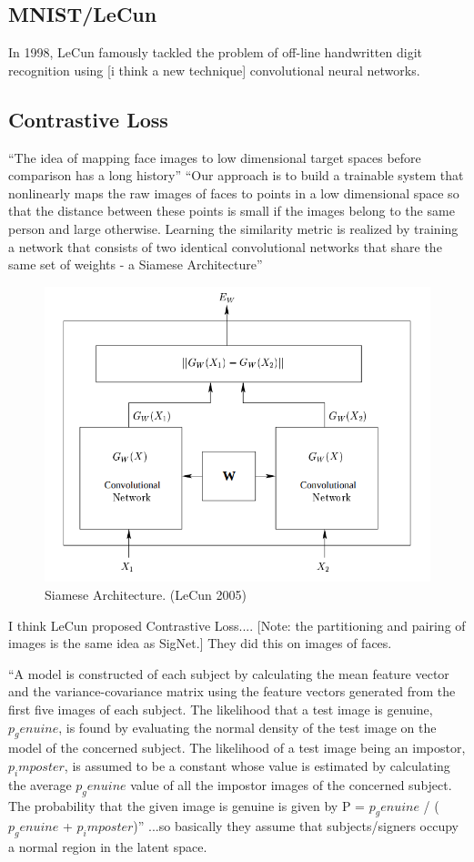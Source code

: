\subsection{MNIST/LeCun}
In 1998, LeCun famously tackled the problem of off-line handwritten digit recognition using [i think a new technique] convolutional neural networks\cite{mnist}.


\subsection{Contrastive Loss}
``The idea of mapping face images to low dimensional target spaces before comparison has a long history''
``Our approach is to build a trainable system that nonlinearly maps the raw images of faces to points in a low dimensional space so that the distance between these points is
small if the images belong to the same person and large otherwise. Learning the similarity metric is realized by training a network that consists of two identical convolutional
networks that share the same set of weights - a Siamese Architecture''
\begin{figure}[h]
    \begin{center}
        \includegraphics[width=0.8\linewidth]{siamese_architecture.png}
    \end{center}
    \caption{Siamese Architecture. (LeCun 2005)}
    \label{fig:siamese}
\end{figure}
I think LeCun proposed Contrastive Loss...\cite{LeCun}.
[Note: the partitioning and pairing of images is the same idea as SigNet.]
They did this on images of faces.

``A model is constructed of each subject by calculating the mean feature
vector and the variance-covariance matrix using the feature
vectors generated from the first five images of each subject.
The likelihood that a test image is genuine, $p_genuine$, is
found by evaluating the normal density of the test image on
the model of the concerned subject. The likelihood of a test
image being an impostor, $p_imposter$, is assumed to be a constant whose value is estimated by calculating the average $p_genuine$ value of all the impostor images of the concerned
subject. The probability that the given image is genuine is
given by P = $p_genuine$ / ($p_genuine$ + $p_imposter$)''
...so basically they assume that subjects/signers occupy a normal region in the latent space.

